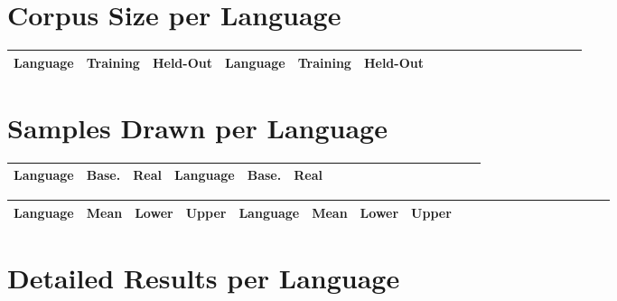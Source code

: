 \documentclass[11pt,letterpaper]{article}
\begin{document}
\section{Corpus Size per Language}

\begin{center}
\begin{longtable}{l|ll||l|llllllllllllll}
	Language & Training & Held-Out & 	Language & Training & Held-Out\\ \hline

\end{longtable}
	\label{tab:corpora}
\end{center}

\section{Samples Drawn per Language}

\begin{center}
\begin{longtable}{l|ll||l|llllllllllllll}
	Language & Base. & Real & Language & Base. & Real \\ \hline

\end{longtable}
	\label{tab:samples}
\end{center}



\begin{center}
\begin{longtable}{l|lll||l|lllllllllllllll}
	Language & Mean & Lower & Upper & Language & Mean & Lower & Upper \\ \hline

\end{longtable}
	\label{tab:boot-g}
\end{center}


\section{Detailed Results per Language}
\end{document}
